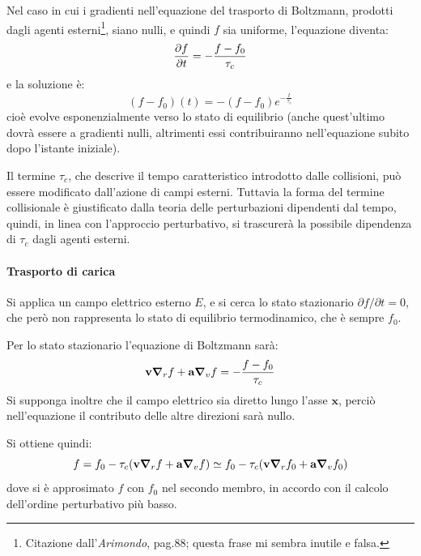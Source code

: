 \begin{es}
	Nel caso in cui i gradienti nell'equazione del trasporto di Boltzmann, prodotti dagli agenti esterni\footnote{Citazione dall'\textit{Arimondo}, pag.88; questa frase mi sembra inutile e falsa.}, siano nulli, e quindi $ f $ sia uniforme, l'equazione diventa:
	\begin{equation*}
	\frac{\partial {f}}{\partial {t}} = -  \frac{f - f_0}{\tau_c}
	\end{equation*}
	e la soluzione è:
	\begin{equation*}
	(f-f_0)(t) = -  (f - f_0)e^{-\frac{t}{\tau_c}}
	\end{equation*}
	cioè evolve esponenzialmente verso lo stato di equilibrio (anche quest'ultimo dovrà essere a gradienti nulli, altrimenti essi contribuiranno nell'equazione subito dopo l'istante iniziale).
\end{es}

Il termine $ \tau_c $, che descrive il tempo caratteristico introdotto dalle collisioni, può essere modificato dall'azione di campi esterni. Tuttavia la forma del termine collisionale è giustificato dalla teoria delle perturbazioni dipendenti dal tempo, quindi, in linea con l'approccio perturbativo, si trascurerà la possibile dipendenza di $ \tau_c $ dagli agenti esterni.

\paragraph{Trasporto di carica} Si applica un campo elettrico esterno $ E $, e si cerca lo stato stazionario $ \partial f / \partial t = 0 $, che però non rappresenta lo stato di equilibrio termodinamico, che è sempre $ f_0 $.

Per lo stato stazionario l'equazione di Boltzmann sarà:
\begin{equation*}
\textbf{v} \grad_r f + \textbf{a} \grad_v f =  -  \frac{f - f_0}{\tau_c}
\end{equation*}
Si supponga inoltre che il campo elettrico sia diretto lungo l'asse $ \textbf{x} $, perciò nell'equazione il contributo delle altre direzioni sarà nullo.

Si ottiene quindi:
\begin{equation*}
f = f_0 - \tau_c(\textbf{v} \grad_r f + \textbf{a} \grad_v f) \simeq f_0 - \tau_c(\textbf{v} \grad_r f_0 + \textbf{a} \grad_v f_0)
\end{equation*}
dove si è approsimato $ f $ con $ f_0 $ nel secondo membro, in accordo con il calcolo dell'ordine perturbativo più basso.

